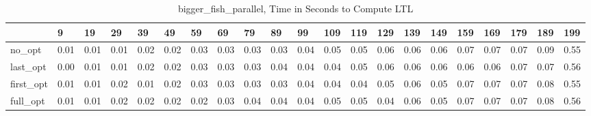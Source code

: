 \begin{table}
\caption{bigger_fish_parallel, Time in Seconds to Compute LTL}
\label{bigger_fish_parallel_LTL_time}
\begin{tabular}{lllllllllllllllllllll}
\toprule
 & 9 & 19 & 29 & 39 & 49 & 59 & 69 & 79 & 89 & 99 & 109 & 119 & 129 & 139 & 149 & 159 & 169 & 179 & 189 & 199 \\
\midrule
no_opt & 0.01 & 0.01 & 0.01 & 0.02 & 0.02 & 0.03 & 0.03 & 0.03 & 0.03 & 0.04 & 0.05 & 0.05 & 0.06 & 0.06 & 0.06 & 0.07 & 0.07 & 0.07 & 0.09 & 0.55 \\
last_opt & 0.00 & 0.01 & 0.01 & 0.02 & 0.02 & 0.03 & 0.03 & 0.03 & 0.04 & 0.04 & 0.04 & 0.05 & 0.06 & 0.06 & 0.06 & 0.06 & 0.06 & 0.07 & 0.07 & 0.56 \\
first_opt & 0.01 & 0.01 & 0.02 & 0.01 & 0.02 & 0.03 & 0.03 & 0.03 & 0.03 & 0.04 & 0.04 & 0.04 & 0.05 & 0.06 & 0.05 & 0.07 & 0.07 & 0.07 & 0.08 & 0.55 \\
full_opt & 0.01 & 0.01 & 0.02 & 0.02 & 0.02 & 0.02 & 0.03 & 0.04 & 0.04 & 0.04 & 0.05 & 0.05 & 0.04 & 0.06 & 0.05 & 0.07 & 0.07 & 0.07 & 0.08 & 0.56 \\
\bottomrule
\end{tabular}
\end{table}
